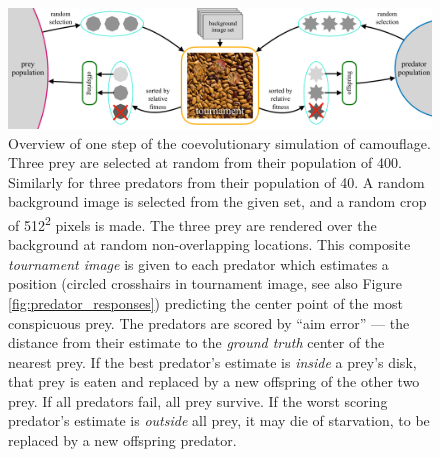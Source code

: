 \documentclass[letterpaper]{article}
\newcommand{\jargon}[1]{\textit{#1}}
\begin{document}

\begin{figure}[t]
    \includegraphics[width=\textwidth]{coc_overview.pdf}
    \caption{Overview of one step of the coevolutionary simulation of camouflage. Three prey are selected at random from their population of 400. Similarly for three predators from their population of 40. A random background image is selected from the given set, and a random crop of 512\textsuperscript{2} pixels is made. The three prey are rendered over the background at random non-overlapping locations. This composite \jargon{tournament image} is given to each predator which estimates a position (circled crosshairs in tournament image, see also Figure \ref{fig:predator_responses}) predicting the center point of the most conspicuous prey. The predators are scored by ``aim error'' --- the distance from their estimate to the \jargon{ground truth} center of the nearest prey. If the best predator's estimate is \textit{inside} a prey's disk, that prey is eaten and replaced by a new offspring of the other two prey. If all predators fail, all prey survive. If the worst scoring predator's estimate is \textit{outside} all prey, it may die of starvation, to be replaced by a new offspring predator.}
    \label{fig:simulation_overview}
\end{figure}

\end{document}
